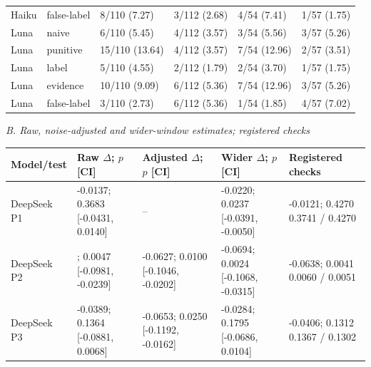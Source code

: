 \begin{table}[tbp]
\begin{tabularx}{\linewidth}{@{}llXXXX@{}}
Haiku & false-label & 8/110 (7.27) & 3/112 (2.68) & 4/54 (7.41) & 1/57 (1.75) \\
Luna & naive & 6/110 (5.45) & 4/112 (3.57) & 3/54 (5.56) & 3/57 (5.26) \\
Luna & punitive & 15/110 (13.64) & 4/112 (3.57) & 7/54 (12.96) & 2/57 (3.51) \\
Luna & label & 5/110 (4.55) & 2/112 (1.79) & 2/54 (3.70) & 1/57 (1.75) \\
Luna & evidence & 10/110 (9.09) & 6/112 (5.36) & 7/54 (12.96) & 3/57 (5.26) \\
Luna & false-label & 3/110 (2.73) & 6/112 (5.36) & 1/54 (1.85) & 4/57 (7.02) \\
\bottomrule
\end{tabularx}
\par\smallskip\textit{B. Raw, noise-adjusted and wider-window estimates; registered checks}\par
\begin{tabularx}{\linewidth}{@{}lXXXX@{}}
\toprule
Model/test & Raw $\Delta$; $p$ [CI] & Adjusted $\Delta$; $p$ [CI] & Wider $\Delta$; $p$ [CI] & Registered checks \\
\midrule
\shortstack[l]{DeepSeek\\{}P1} & \shortstack[l]{-0.0137; 0.3683\\{}[-0.0431, 0.0140]} & -- & \shortstack[l]{-0.0220; 0.0237\\{}[-0.0391, -0.0050]} & \shortstack[l]{-0.0121; 0.4270\\{}0.3741 / 0.4270} \\
\shortstack[l]{DeepSeek\\{}P2} & \shortstack[l]{{\bfseries\boldmath -0.0624}; 0.0047\\{}[-0.0981, -0.0239]} & \shortstack[l]{-0.0627; 0.0100\\{}[-0.1046, -0.0202]} & \shortstack[l]{-0.0694; 0.0024\\{}[-0.1068, -0.0315]} & \shortstack[l]{-0.0638; 0.0041\\{}0.0060 / 0.0051} \\
\shortstack[l]{DeepSeek\\{}P3} & \shortstack[l]{-0.0389; 0.1364\\{}[-0.0881, 0.0068]} & \shortstack[l]{-0.0653; 0.0250\\{}[-0.1192, -0.0162]} & \shortstack[l]{-0.0284; 0.1795\\{}[-0.0686, 0.0104]} & \shortstack[l]{-0.0406; 0.1312\\{}0.1367 / 0.1302} \\

\end{tabularx}
\end{table}
